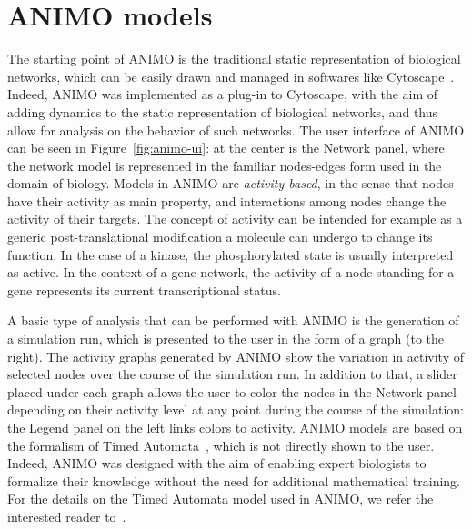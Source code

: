 \documentclass[submission,copyright,creativecommons]{eptcs}
\def\tas{Timed Automata}
\begin{document}
\section{ANIMO models}
The starting point of ANIMO is the traditional static representation of biological networks,
which can be easily drawn and managed in softwares like Cytoscape~\cite{cytoscape}. Indeed, ANIMO was implemented
as a plug-in to Cytoscape, with the aim of adding dynamics to the static representation of biological
networks, and thus allow for analysis on the behavior of such networks. The user interface of ANIMO
can be seen in Figure~\ref{fig:animo-ui}: at the center is the Network panel, where the network
model is represented in the familiar nodes-edges form used in the domain of biology.
Models in ANIMO are \emph{activity-based}, in the sense that nodes have their activity as main
property, and interactions among nodes change the activity of their targets. The concept of activity
can be intended for example as a generic post-translational modification a molecule can undergo to change its
function. In the case of a kinase, the phosphorylated state is usually interpreted as active.
In the context of a gene network, the activity of a node standing for a gene represents its current
transcriptional status.

A basic type of analysis that can be performed with ANIMO is the generation of
a simulation run, which is presented to the user in the form of a graph (to the right). The activity
graphs generated by ANIMO show the variation in activity of selected nodes over the course of the simulation run.
In addition to that, a slider placed under each graph allows the user to color the nodes in the Network panel
depending on their activity level at any point during the course of the simulation: the Legend
panel on the left links colors to activity. ANIMO models are based on the formalism of \tas~\cite{timed-automata-alur-dill},
which is not directly shown to the user. Indeed, ANIMO was designed with the aim of enabling expert biologists
to formalize their knowledge without the need for additional mathematical training.
For the details on the Timed Automata model used in ANIMO, we refer the interested reader to~\cite{animo-ieee}.
\end{document}
